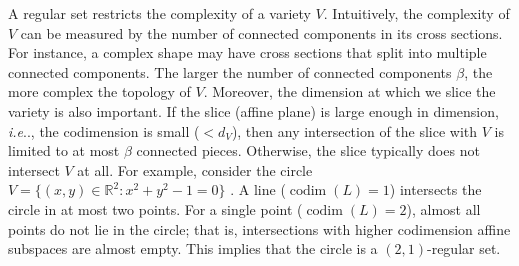 \documentclass{article}
\makeatletter
\def\@onedot{\ifx\@let@token.\else.\null\fi\xspace}
\DeclareRobustCommand\onedot{\futurelet\@let@token\@onedot}
\def\ie{\emph{i.e}\onedot}
\theoremstyle{plain}
\theoremstyle{definition}
\theoremstyle{remark}
\makeatother
\begin{document}
A regular set restricts the complexity of a variety \(V\). Intuitively, the complexity of \(V\) can be measured by the number of connected components in its cross sections. For instance, a complex shape may have cross sections that split into multiple connected components. The larger the number of connected components \(\beta\), the more complex the topology of \(V\).
Moreover, the dimension at which we slice the variety is also important. If the slice (affine plane) is large enough in dimension, \ie, the codimension is small ($<d_V$), then any intersection of the slice with $V$ is limited to at most $\beta$ connected pieces. Otherwise, the slice typically does not intersect \(V\) at all. For example, consider the circle $V = \{(x,y)\in \mathbb{R}^2 : x^2 + y^2 - 1=0\}$ .
A line ($\operatorname{codim}(L)=1$) intersects the circle in at most two points. For a single point ($\operatorname{codim}(L)=2$), almost all points do not lie in the circle; that is, intersections with higher codimension affine subspaces are almost empty. This implies that the circle is a $(2,1)$-regular set. 
\end{document}
